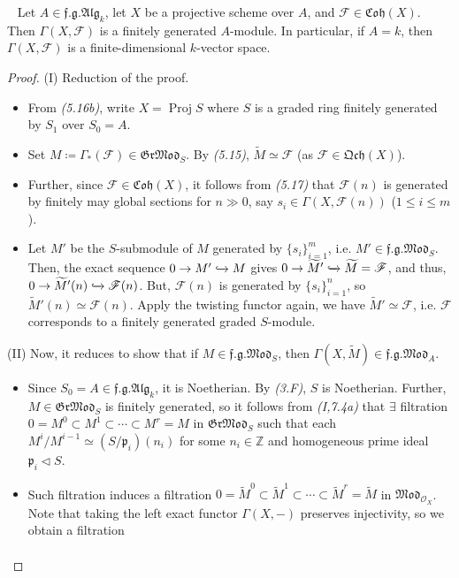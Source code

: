 \documentclass[11pt,a4paper,footinclude=true,headinclude=true]{scrbook} %
\DeclareMathOperator{\Proj}{Proj}
\newcommand{\FF}{\mathscr{F}}
\newcommand{\OO}{\mathcal{O}}
\newcommand{\pp}{\mathfrak{p}}
\newcommand{\<}{\langle}
\newcommand{\>}{\rangle}
\newcommand{\GR}{\mathfrak{Gr}}
\newcommand{\fg}{\mathfrak{f.g.}}
\newcommand{\MOD}{\mathfrak{Mod}}
\newcommand{\qcoh}{\mathfrak{Qch}}
\newcommand{\ALG}{\mathfrak{Alg}}
\newcommand{\coh}{\mathfrak{Coh}}
\newenvironment{theorem}[2][]
{\renewcommand\theinnercustomthm{#2}\innercustomthm[#1]
\begin{mdframed}[backgroundcolor=yellow!20]\ }
{\end{mdframed}\endinnercustomthm}
\begin{document}
\begin{theorem}{5.19}
    Let $A\in\fg\ALG_k$, let $X$ be a projective scheme over $A$, and $\FF\in\coh(X)$. Then $\Gamma(X,\FF)$ is a finitely generated $A$-module. In particular, if $A=k$, then $\Gamma(X,\FF)$ is a finite-dimensional $k$-vector space.
\end{theorem}
\begin{proof}
    (I) Reduction of the proof.
    \begin{itemize}
        \item From \textit{(5.16b)}, write $X=\Proj S$ where $S$ is a graded ring finitely generated by $S_1$ over $S_0=A$.
        \item Set $M\coloneqq\Gamma_\ast(\FF)\in \GR\MOD_S$. By \textit{(5.15)}, $\widetilde{M}\simeq\FF$ (as $\FF\in\qcoh(X)$).
        \item Further, since $\FF\in\coh(X)$, it follows from \textit{(5.17)} that $\FF(n)$ is generated by finitely may global sections for $n\gg0$, say $s_i\in\Gamma(X,\FF(n))$ ($1\leq i\leq m$).
        \item Let $M'$ be the $S$-submodule of $M$ generated by $\{s_i\}_{i=1}^m$, i.e. $M'\in\fg\MOD_S$. Then, the exact sequence $0\to M'\xhookrightarrow{}M$ gives $0\to\widetilde{M}'\xhookrightarrow{}\widetilde{M}=\FF$, and thus, $0\to\widetilde{M}'(n)\xhookrightarrow{}\FF(n)$. But, $\FF(n)$ is generated by $\{s_i\}_{i=1}^n$, so $\widetilde{M}'(n)\simeq\FF(n)$. Apply the twisting functor again, we have $\widetilde{M}'\simeq\FF$, i.e. $\FF$ corresponds to a finitely generated graded $S$-module. 
    \end{itemize}
    (II) Now, it reduces to show that if $M\in\fg\MOD_S$, then $\Gamma(X,\widetilde{M})\in\fg\MOD_A$.
    \begin{itemize}
        \item Since $S_0=A\in\fg\ALG_k$, it is Noetherian. By \textit{(3.F)}, $S$ is Noetherian. Further, $M\in\GR\MOD_S$ is finitely generated, so it follows from \textit{(I,7.4a)} that $\exists$ filtration $0=M^0\subset M^1\subset\cdots\subset M^r=M$ in $\GR\MOD_S$ such that each $M^i/M^{i-1}\simeq(S/\pp_i)(n_i)$ for some $n_i\in\mathbb{Z}$ and homogeneous prime ideal $\pp_i\triangleleft S$.
        \item Such filtration induces a filtration $0=\widetilde{M}^0\subset\widetilde{M}^1\subset\cdots\subset\widetilde{M}^r=\widetilde{M}$ in $\MOD_{\OO_X}$. Note that taking the left exact functor $\Gamma(X,-)$ preserves injectivity, so we obtain a filtration 
        \begin{align*}

\end{align*}
\end{itemize}
\end{proof}
\end{document}

